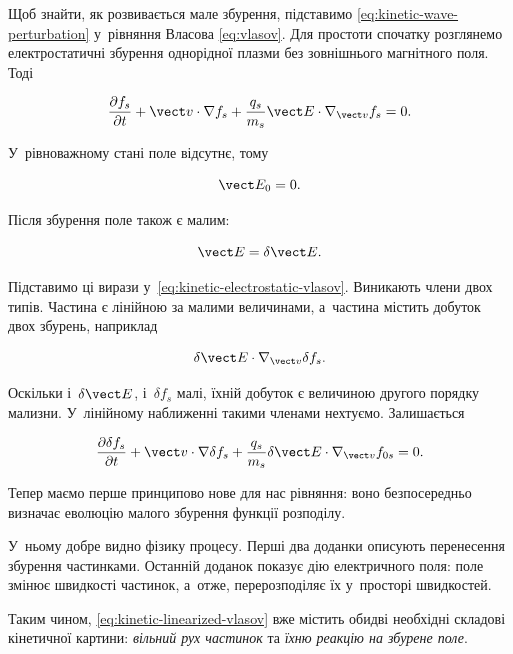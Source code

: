 Щоб знайти, як розвивається мале збурення, підставимо \eqref{eq:kinetic-wave-perturbation}
у~рівняння Власова \eqref{eq:vlasov}. Для простоти спочатку розглянемо електростатичні
збурення однорідної плазми без зовнішнього магнітного поля. Тоді

\begin{equation}\label{eq:kinetic-electrostatic-vlasov}
\frac{\partial f_s}{\partial t}
+
\vect v\cdot\nabla f_s
+
\frac{q_s}{m_s}\vect E\cdot\nabla_{\vect v}f_s
=0.
\end{equation}

У~рівноважному стані поле відсутнє, тому

\begin{equation*}
\vect E_0=0.
\end{equation*}

Після збурення поле також є малим:

\begin{equation*}
\vect E=\delta\vect E.
\end{equation*}

Підставимо ці вирази у~\eqref{eq:kinetic-electrostatic-vlasov}. Виникають члени двох
типів. Частина є лінійною за малими величинами, а~частина містить добуток двох
збурень, наприклад

\begin{equation*}
\delta\vect E\cdot\nabla_{\vect v}\delta f_s.
\end{equation*}

Оскільки і~$\delta\vect E$, і~$\delta f_s$ малі, їхній добуток є величиною другого
порядку мализни. У~лінійному наближенні такими членами нехтуємо. Залишається

\begin{equation}\label{eq:kinetic-linearized-vlasov}
\frac{\partial\delta f_s}{\partial t}
+
\vect v\cdot\nabla\delta f_s
+
\frac{q_s}{m_s}
\delta\vect E\cdot\nabla_{\vect v}f_{0s}
=0.
\end{equation}

Тепер маємо перше принципово нове для нас рівняння: воно безпосередньо визначає еволюцію
малого збурення функції розподілу.

У~ньому добре видно фізику процесу. Перші два доданки описують перенесення збурення
частинками. Останній доданок показує дію електричного поля: поле змінює швидкості
частинок, а~отже, перерозподіляє їх у~просторі швидкостей.

Таким чином, \eqref{eq:kinetic-linearized-vlasov} вже містить обидві необхідні складові
кінетичної картини: \emph{вільний рух частинок} та \emph{їхню реакцію на збурене поле}.

